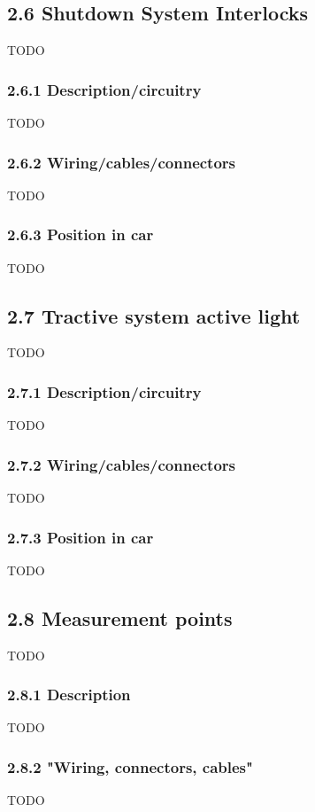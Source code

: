 \documentclass{article}
\begin{document}
\subsection*{2.6 Shutdown System Interlocks}
TODO

\subsubsection*{2.6.1 Description/circuitry}
TODO

\subsubsection*{2.6.2 Wiring/cables/connectors}
TODO

\subsubsection*{2.6.3 Position in car}
TODO

\subsection*{2.7 Tractive system active light}
TODO

\subsubsection*{2.7.1 Description/circuitry}
TODO

\subsubsection*{2.7.2 Wiring/cables/connectors}
TODO

\subsubsection*{2.7.3 Position in car}
TODO

\subsection*{2.8 Measurement points}
TODO

\subsubsection*{2.8.1 Description}
TODO

\subsubsection*{2.8.2 "Wiring, connectors, cables"}
TODO
\end{document}
